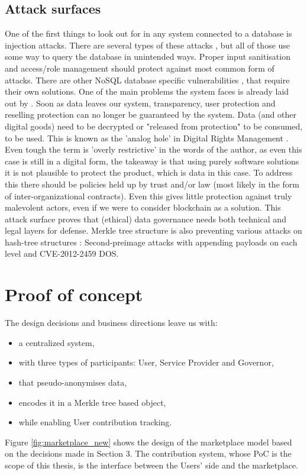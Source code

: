 \documentclass[english, 12pt, a4paper, sci, utf8, a-2b, online]{aaltothesis}
\theoremstyle{change}
\theoremstyle{theoremstyle}
\begin{document}
\subsection{Attack surfaces}\label{sec:attack_surf}
One of the first things to look out for in any system connected to a database is injection attacks. There are several types of these attacks \cite{halfond2006classification}, but all of those use some way to query the database in unintended ways. Proper input sanitisation and access/role management should protect against most common form of attacks. There are other NoSQL database specific vulnerabilities \cite{fahd2019comparative}, that require their own solutions.
One of the main problems the system faces is already laid out by \cite{hyrynsalmi2023balancing}. Soon as data leaves our system, transparency, user protection and reselling protection can no longer be guaranteed by the system. Data (and other digital goods) need to be decrypted or "released from protection" to be consumed, to be used. This is known as the 'analog hole' in Digital Rights Management \cite{haber2003if}. Even tough the term is 'overly restrictive' in the words of the author, as even this case is still in a digital form, the takeaway is that using purely software solutions it is not plausible to protect the product, which is data in this case. To address this there should be policies held up by trust and/or law (most likely in the form of inter-organizational contracts). Even this gives little protection against truly malevolent actors, even if we were to consider blockchain as a solution. This attack surface proves that (ethical) data governance needs both technical and legal layers for defense. 
Merkle tree structure is also preventing various attacks on hash-tree structures \cite{fmerg2022pymerkle}: Second-preimage attacks with appending payloads on each level and CVE-2012-2459 DOS.

\clearpage

\section{Proof of concept}

The design decisions and business directions leave us with:
\begin{itemize}
    \item a centralized system,
    \item with three types of participants: User, Service Provider and Governor,
    \item that pseudo-anonymises data,
    \item encodes it in a Merkle tree based object,
    \item while enabling User contribution tracking.
\end{itemize}
Figure \ref{fig:marketplace_new} shows the design of the marketplace model based on the decisions made in Section 3. The contribution system, whose PoC is the scope of this thesis, is the interface between the Users' side and the marketplace.
\end{document}
